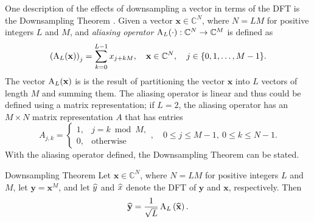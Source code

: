 One description of the effects of downsampling a vector in terms of the DFT is the Downsampling Theorem \cite[Ch.~7]{AudioDFT}. Given a vector $\mathbf{x} \in \mathbb{C}^N$, where $N = LM$ for positive integers $L$ and $M$, and \textit{aliasing operator} $\operatorname{A}_L(\cdot) : \mathbb{C}^N \rightarrow \mathbb{C}^M$ is defined as
\[\left(\operatorname{A}_L(\mathbf{x})\right)_j = \sum_{k=0}^{L-1} x_{j+kM}, \quad \mathbf{x} \in \mathbb{C}^N, \quad j \in \{0,1,\ldots,M-1\}.\]
The vector $\operatorname{A}_L(\mathbf{x})$ is is the result of partitioning the vector $\mathbf{x}$ into $L$ vectors of length $M$ and summing them. The aliasing operator is linear and thus could be defined using a matrix representation; if $L = 2$, the aliasing operator has an $M \times N$ matrix representation $A$ that has entries
\[A_{j,k} = \begin{cases}
1, & j = k \bmod M, \\
0, & \text{otherwise}
\end{cases}, \quad 0 \leq j \leq M-1, ~ 0 \leq k \leq N-1.\]
With the aliasing operator defined, the Downsampling Theorem can be stated.
\begin{theorem}{Downsampling Theorem}
Let $\mathbf{x} \in \mathbb{C}^N$, where $N = LM$ for positive integers $L$ and $M$, let $\mathbf{y} = \mathbf{x}^M$, and let $\widehat{y}$ and $\widehat{x}$ denote the DFT of $\mathbf{y}$ and $\mathbf{x}$, respectively. Then
\[\widehat{\mathbf{y}} = \frac{1}{\sqrt{L}}\operatorname{A}_L\left(\widehat{\mathbf{x}}\right).\]
\end{theorem}
